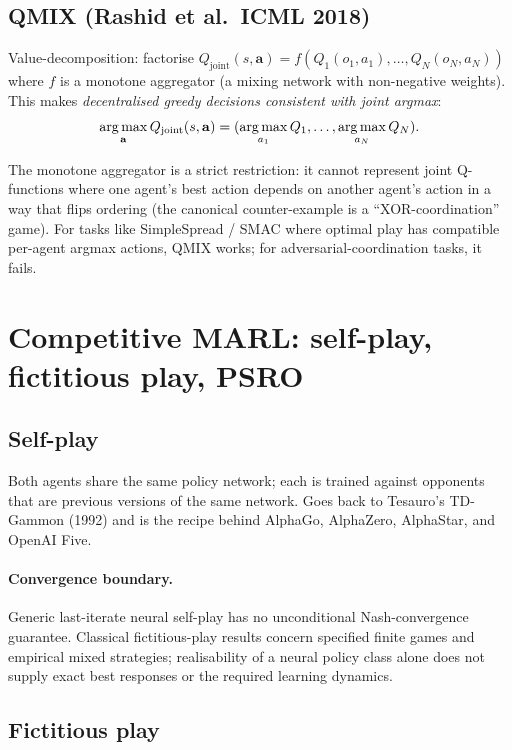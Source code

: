 \documentclass[11pt,oneside]{scrbook}
\begin{document}
\subsection{QMIX (Rashid et al.\ ICML 2018)}

Value-decomposition: factorise $Q_{\mathrm{joint}}(s, \mathbf{a}) = f(Q_1(o_1, a_1), \dots, Q_N(o_N, a_N))$
where $f$ is a monotone aggregator (a mixing network with non-negative
weights). This makes \emph{decentralised greedy decisions consistent with
joint argmax}:
\[
\operatorname*{arg\,max}_{\mathbf{a}} Q_{\mathrm{joint}}(s, \mathbf{a}) = (\operatorname*{arg\,max}_{a_1} Q_1, \dots, \operatorname*{arg\,max}_{a_N} Q_N).
\]

\begin{remark}
The monotone aggregator is a strict restriction: it cannot represent joint
Q-functions where one agent's best action depends on another agent's
action in a way that flips ordering (the canonical counter-example is a
``XOR-coordination'' game). For tasks like SimpleSpread / SMAC where
optimal play has compatible per-agent argmax actions, QMIX works; for
adversarial-coordination tasks, it fails.
\end{remark}

\section{Competitive MARL: self-play, fictitious play, PSRO}

\subsection{Self-play}

Both agents share the same policy network; each is trained against
opponents that are previous versions of the same network. Goes back to
Tesauro's TD-Gammon (1992) and is the recipe behind AlphaGo, AlphaZero,
AlphaStar, and OpenAI Five.

\paragraph{Convergence boundary.}
Generic last-iterate neural self-play has no unconditional Nash-convergence
guarantee. Classical fictitious-play results concern specified finite games
and empirical mixed strategies; realisability of a neural policy class alone
does not supply exact best responses or the required learning dynamics.



\subsection{Fictitious play}
\end{document}
